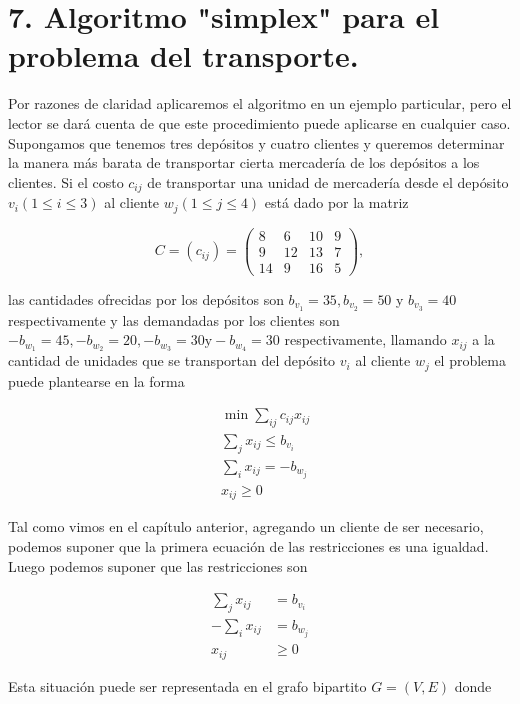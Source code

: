 \documentclass[10pt]{article}
\begin{document}
\section*{7. Algoritmo "simplex" para el problema del transporte.}
Por razones de claridad aplicaremos el algoritmo en un ejemplo particular, pero el lector se dará cuenta de que este procedimiento puede aplicarse en cualquier caso.\\
Supongamos que tenemos tres depósitos y cuatro clientes y queremos determinar la manera más barata de transportar cierta mercadería de los depósitos a los clientes. Si el costo $c_{i j}$ de transportar una unidad de mercadería desde el depósito $v_{i}(1 \leq i \leq 3)$ al cliente $w_{j}(1 \leq j \leq 4)$ está dado por la matriz

$$
C=\left(c_{i j}\right)=\left(\begin{array}{cccc}
8 & 6 & 10 & 9 \\
9 & 12 & 13 & 7 \\
14 & 9 & 16 & 5
\end{array}\right),
$$

las cantidades ofrecidas por los depósitos son $b_{v_{1}}=35, b_{v_{2}}=50$ y $b_{v_{3}}=40$ respectivamente y las demandadas por los clientes son $-b_{w_{1}}=45,-b_{w_{2}}=20,-b_{w_{3}}=30 \mathrm{y}-b_{w_{4}}=30$ respectivamente, llamando $x_{i j}$ a la\\
cantidad de unidades que se transportan del depósito $v_{i}$ al cliente $w_{j}$ el problema puede plantearse en la forma

$$
\begin{aligned}
& \min \sum_{i j} c_{i j} x_{i j} \\
& \sum_{j} x_{i j} \leq b_{v_{i}} \\
& \sum_{i} x_{i j}=-b_{w_{j}} \\
& x_{i j} \geq 0
\end{aligned}
$$

Tal como vimos en el capítulo anterior, agregando un cliente de ser necesario, podemos suponer que la primera ecuación de las restricciones es una igualdad. Luego podemos suponer que las restricciones son

$$
\begin{aligned}
\sum_{j} x_{i j} & =b_{v_{i}} \\
-\sum_{i} x_{i j} & =b_{w_{j}} \\
x_{i j} & \geq 0
\end{aligned}
$$

Esta situación puede ser representada en el grafo bipartito $G=(V, E)$ donde
\end{document}
